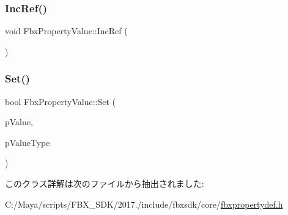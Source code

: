 \subsubsection{\texorpdfstring{Inc\+Ref()}{IncRef()}}
{\footnotesize\ttfamily void Fbx\+Property\+Value\+::\+Inc\+Ref (\begin{DoxyParamCaption}{ }\end{DoxyParamCaption})}

\mbox{\label{class_fbx_property_value_a619bc0993f915fced412d4c78c739769}} 
\subsubsection{\texorpdfstring{Set()}{Set()}}
{\footnotesize\ttfamily bool Fbx\+Property\+Value\+::\+Set (\begin{DoxyParamCaption}\item[{const void $\ast$}]{p\+Value,  }\item[{\hyperlink{fbxpropertytypes_8h_a73913a5ddfb20e57c6f25e9e6784bd92}{E\+Fbx\+Type}}]{p\+Value\+Type }\end{DoxyParamCaption})}



このクラス詳解は次のファイルから抽出されました\+:\begin{DoxyCompactItemize}
\item 
C\+:/\+Maya/scripts/\+F\+B\+X\+\_\+\+S\+D\+K/2017./include/fbxsdk/core/\hyperlink{fbxpropertydef_8h}{fbxpropertydef.\+h}\end{DoxyCompactItemize}
